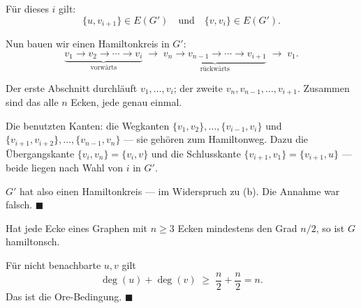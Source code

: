 \begin{merksatz}
Für dieses $i$ gilt:
\[ \{u, v_{i+1}\} \in E(G') \quad \text{und} \quad \{v, v_i\} \in E(G') . \]

Nun bauen wir einen Hamiltonkreis in $G'$:
\[ \underbrace{v_1 \to v_2 \to \cdots \to v_i}_{\text{vorwärts}} \;\to\; \underbrace{v_n \to v_{n-1} \to \cdots \to v_{i+1}}_{\text{rückwärts}} \;\to\; v_1 . \]

\begin{center}
\end{center}

Der erste Abschnitt durchläuft $v_1, \ldots, v_i$; der zweite $v_n, v_{n-1}, \ldots, v_{i+1}$. Zusammen sind das alle $n$ Ecken, jede genau einmal.

Die benutzten Kanten: die Wegkanten $\{v_1,v_2\}, \ldots, \{v_{i-1},v_i\}$ und $\{v_{i+1},v_{i+2}\}, \ldots, \{v_{n-1},v_n\}$ --- sie gehören zum Hamiltonweg. Dazu die Übergangskante $\{v_i, v_n\} = \{v_i, v\}$ und die Schlusskante $\{v_{i+1}, v_1\} = \{v_{i+1}, u\}$ --- beide liegen nach Wahl von $i$ in $G'$.

$G'$ hat also einen Hamiltonkreis --- im Widerspruch zu (b). Die Annahme war falsch. $\blacksquare$
\end{merksatz}

\begin{merksatz}
Hat jede Ecke eines Graphen mit $n \ge 3$ Ecken mindestens den Grad $n/2$, so ist $G$ hamiltonsch.

Für nicht benachbarte $u, v$ gilt
\[ \deg(u) + \deg(v) \;\ge\; \frac{n}{2} + \frac{n}{2} = n . \]
Das ist die Ore-Bedingung. $\blacksquare$

\begin{center}
\begin{minipage}{0.88\textwidth}
\end{minipage}
\end{center}
\end{merksatz}

